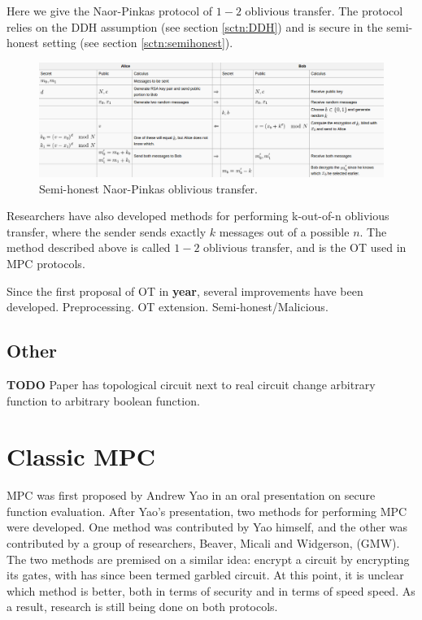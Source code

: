 \documentclass[12pt,twoside]{reedthesis}
\begin{document}
Here we give the Naor-Pinkas protocol of $1-2$ oblivious transfer.
The protocol relies on the DDH assumption (see section \ref{sctn:DDH}) and is secure in the semi-honest setting (see section \ref{sctn:semihonest}).

\begin{figure}
    \centering
    \includegraphics[scale=0.3]{images/ot_wiki}
    \caption{Semi-honest Naor-Pinkas oblivious transfer.}
\end{figure}

Researchers have also developed methods for performing k-out-of-n oblivious transfer, where the sender sends exactly $k$ messages out of a possible $n$.
The method described above is called $1-2$ oblivious transfer, and is the OT used in MPC protocols.

Since the first proposal of OT in \textbf{year}, several improvements have been developed.
Preprocessing.
OT extension.
Semi-honest/Malicious.

\subsection{Other}
\textbf{TODO}
Paper has topological circuit next to real circuit
change arbitrary function to arbitrary boolean function.

\section{Classic MPC}
MPC was first proposed by Andrew Yao in an oral presentation on secure function evaluation.
After Yao's presentation, two methods for performing MPC were developed.
One method was contributed by Yao himself, and the other was contributed by a group of researchers, Beaver, Micali and Widgerson, (GMW).
The two methods are premised on a similar idea: encrypt a circuit by encrypting its gates, with has since been termed garbled circuit.
At this point, it is unclear which method is better, both in terms of security and in terms of speed speed. 
As a result, research is still being done on both protocols.
\end{document}
